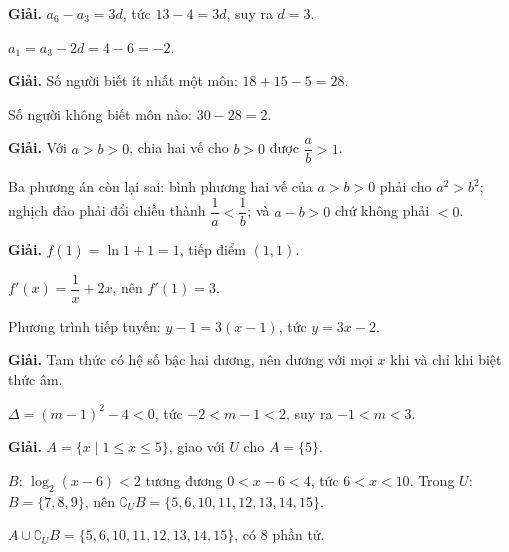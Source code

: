 \documentclass[11pt, a4paper]{article}
\begin{document}
\vspace{0.3cm}
\begin{dapan}[30 — Đáp án A]

\textbf{Giải.} $a_6 - a_3 = 3d$, tức $13 - 4 = 3d$, suy ra $d = 3$.

$a_1 = a_3 - 2d = 4 - 6 = -2$.


\end{dapan}
\vspace{0.3cm}
\begin{dapan}[31 — Đáp án D]

\textbf{Giải.} Số người biết ít nhất một môn: $18 + 15 - 5 = 28$.

Số người không biết môn nào: $30 - 28 = 2$.


\end{dapan}
\vspace{0.3cm}
\begin{dapan}[32 — Đáp án D]

\textbf{Giải.} Với $a > b > 0$, chia hai vế cho $b > 0$ được $\dfrac{a}{b} > 1$.

Ba phương án còn lại sai: bình phương hai vế của $a > b > 0$ phải cho $a^2 > b^2$; nghịch đảo phải đổi chiều thành $\dfrac{1}{a} < \dfrac{1}{b}$; và $a - b > 0$ chứ không phải $< 0$.


\end{dapan}
\vspace{0.3cm}
\begin{dapan}[33 — Đáp án D]

\textbf{Giải.} $f(1) = \ln 1 + 1 = 1$, tiếp điểm $(1,1)$.

$f'(x) = \dfrac{1}{x} + 2x$, nên $f'(1) = 3$.

Phương trình tiếp tuyến: $y - 1 = 3(x-1)$, tức $y = 3x - 2$.


\end{dapan}
\vspace{0.3cm}
\begin{dapan}[34 — Đáp án A]

\textbf{Giải.} Tam thức có hệ số bậc hai dương, nên dương với mọi $x$ khi và chỉ khi biệt thức âm.

$\Delta = (m-1)^2 - 4 < 0$, tức $-2 < m-1 < 2$, suy ra $-1 < m < 3$.


\end{dapan}
\vspace{0.3cm}
\begin{dapan}[35 — Đáp án A]

\textbf{Giải.} $A = \{x \mid 1 \le x \le 5\}$, giao với $U$ cho $A = \{5\}$.

$B$: $\log_2(x-6) < 2$ tương đương $0 < x - 6 < 4$, tức $6 < x < 10$. Trong $U$: $B = \{7,8,9\}$, nên $\complement_U B = \{5,6,10,11,12,13,14,15\}$.

$A \cup \complement_U B = \{5,6,10,11,12,13,14,15\}$, có $8$ phần tử.


\end{dapan}
\end{document}

